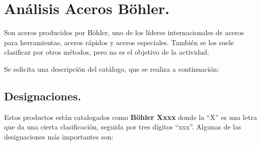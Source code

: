 \documentclass[12pt,a4paper]{article}
\begin{document}

\tableofcontents
\begin{abstract}
    \underline{\textbf{Requerimiento del Trabajo.}}
    Analice e investigue el contenido del catálogo que se indica a fin de adquirir la capacidad de explicar el significado de la información que allí se detalla:
    \begin{itemize}
        \item Böhler. Centro de Materiales. Sitio Web: \url{https://www.acerosboehler.com.ar/es/material-center/}
        \item Böhler. Catálogo de aceros para herramientas. \url{https://www.acerosbohler.com/app/uploads/sites/101/2019/08/B%C3%B6hler_toolsteel_2018_LQ.pdf}
        \item Arcelor-Mittal. Catálogo de Productos. Sitio Web: \url{https://www.acindar.com.ar/wp-content/uploads/2018/11/Catalogode-productos-para-la-industria.pdf}
        \item IRAM - Hojas Características de los Aceros \{MM-CAD-TP 2-01\}
        \item SSAB. Su guía para los productos de acero antidesgaste Hardox\textsuperscript{\textregistered}. Sitio Web: \url{https://www.ssab.lat/marcas-y-productos/hardox/productprogram}
    \end{itemize}
\end{abstract}

\section{Análisis Aceros Böhler.}
Son aceros producidos por Böhler, uno de los líderes internacionales de aceros para herramientas, aceros rápidos y aceros especiales. También se los suele clasificar por otros métodos, pero no es el objetivo de la actividad. 

Se solicita una descripción del catálogo, que se realiza a continuación:

\subsection{Designaciones.}
Estos productos están catalogados como \textbf{Böhler Xxxx} donde la “X” es una letra que da una cierta clasificación, seguida por tres dígitos “xxx”. Algunas de las designaciones más importantes son:
\end{document}

